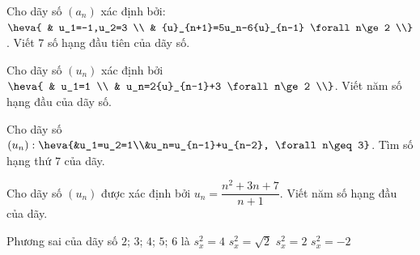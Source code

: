 \begin{bt}%
	Cho dãy số $(a_n)$ xác định bởi: $\heva{ 
	& u_1=-1,u_2=3  \\
	& {u}_{n+1}=5u_n-6{u}_{n-1} \forall n\ge 2 \\}$. Viết 7 số  hạng đầu tiên của dãy số.
\end{bt}

\begin{bt}%
	 Cho dãy số $(u_n)$ xác định bởi $\heva{
	& u_1=1  \\
	& u_n=2{u}_{n-1}+3 \forall n\ge 2 \\}$. Viết năm số  hạng đầu của dãy số.
\end{bt}

\begin{bt}%
	Cho dãy số  $(u_n):\heva{&u_1=u_2=1\\&u_n=u_{n-1}+u_{n-2}, \forall n\geq 3}$. Tìm số hạng thứ $7$ của dãy.
\end{bt}

\begin{ex}%
	Cho  dãy số $(u_n)$ được xác định bởi $u_n=\dfrac{n^2+3n+7}{n+1}$. Viết năm số hạng đầu của dãy.
\end{ex}

\begin{ex}%
	Phương sai của  dãy số $2$; $3$; $4$; $5$; $6$ là
	\choice 
		{$s_x^2=4$} 
		 {$s_x^2=\sqrt{2}$}
		{\True  $s_x^2=2$}
		{$s_x^2=-2$} 
\end{ex}

